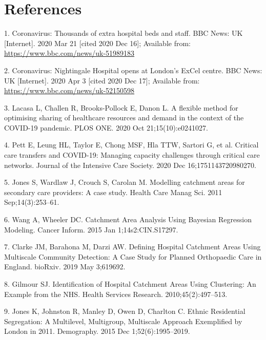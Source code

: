 \documentclass[
]{article}
\begin{document}
\hypertarget{references}{%
\section{References}\label{references}}

\hypertarget{refs}{}
\leavevmode\hypertarget{ref-CoronavirusThousandsExtra2020}{}%
1. Coronavirus: Thousands of extra hospital beds and staff. BBC News: UK
{[}Internet{]}. 2020 Mar 21 {[}cited 2020 Dec 16{]}; Available from:
\url{https://www.bbc.com/news/uk-51989183}

\leavevmode\hypertarget{ref-CoronavirusNightingaleHospital2020}{}%
2. Coronavirus: Nightingale Hospital opens at London's ExCel centre. BBC
News: UK {[}Internet{]}. 2020 Apr 3 {[}cited 2020 Dec 17{]}; Available
from: \url{https://www.bbc.com/news/uk-52150598}

\leavevmode\hypertarget{ref-lacasaFlexibleMethodOptimising2020}{}%
3. Lacasa L, Challen R, Brooks-Pollock E, Danon L. A flexible method for
optimising sharing of healthcare resources and demand in the context of
the COVID-19 pandemic. PLOS ONE. 2020 Oct 21;15(10):e0241027.

\leavevmode\hypertarget{ref-pettCriticalCareTransfers2020}{}%
4. Pett E, Leung HL, Taylor E, Chong MSF, Hla TTW, Sartori G, et al.
Critical care transfers and COVID-19: Managing capacity challenges
through critical care networks. Journal of the Intensive Care Society.
2020 Dec 16;1751143720980270.

\leavevmode\hypertarget{ref-jonesModellingCatchmentAreas2011}{}%
5. Jones S, Wardlaw J, Crouch S, Carolan M. Modelling catchment areas
for secondary care providers: A case study. Health Care Manag Sci. 2011
Sep;14(3):253--61.

\leavevmode\hypertarget{ref-wangCatchmentAreaAnalysis2015}{}%
6. Wang A, Wheeler DC. Catchment Area Analysis Using Bayesian Regression
Modeling. Cancer Inform. 2015 Jan 1;14s2:CIN.S17297.

\leavevmode\hypertarget{ref-clarkeDefiningHospitalCatchment2019}{}%
7. Clarke JM, Barahona M, Darzi AW. Defining Hospital Catchment Areas
Using Multiscale Community Detection: A Case Study for Planned
Orthopaedic Care in England. bioRxiv. 2019 May 3;619692.

\leavevmode\hypertarget{ref-gilmourIdentificationHospitalCatchment2010}{}%
8. Gilmour SJ. Identification of Hospital Catchment Areas Using
Clustering: An Example from the NHS. Health Services Research.
2010;45(2):497--513.

\leavevmode\hypertarget{ref-jonesEthnicResidentialSegregation2015}{}%
9. Jones K, Johnston R, Manley D, Owen D, Charlton C. Ethnic Residential
Segregation: A Multilevel, Multigroup, Multiscale Approach Exemplified
by London in 2011. Demography. 2015 Dec 1;52(6):1995--2019.
\end{document}
